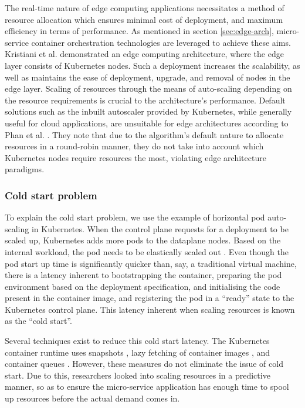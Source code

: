 The real-time nature of edge computing applications necessitates a method of resource allocation which ensures minimal cost of deployment, and maximum efficiency in terms of performance. As mentioned in section \ref{sec:edge-arch}, micro-service container orchestration technologies are leveraged to achieve these aims. Kristiani et al. \cite{kristiani2019} demonstrated an edge computing architecture, where the edge layer consists of Kubernetes nodes. Such a deployment increases the scalability, as well as maintains the ease of deployment, upgrade, and removal of nodes in the edge layer. Scaling of resources through the means of auto-scaling depending on the resource requirements is crucial to the architecture's performance. Default solutions such as the inbuilt autoscaler provided by Kubernetes, while generally useful for cloud applications, are unsuitable for edge architectures according to Phan et al. \cite{phan2022traffic}. They note that due to the algorithm's default nature to allocate resources in a round-robin manner, they do not take into account which Kubernetes nodes require resources the most, violating edge architecture paradigms.

\subsubsection{Cold start problem}
\label{subsubsec:cold-start}

To explain the cold start problem, we use the example of horizontal pod auto-scaling in Kubernetes. When the control plane requests for a deployment to be scaled up, Kubernetes adds more pods to the dataplane nodes.  Based on the internal workload, the pod needs to be elastically scaled out \cite{beni2021reducing}. Even though the pod start up time is significantly quicker than, say, a traditional virtual machine, there is a latency inherent to bootstrapping the container, preparing the pod environment based on the deployment specification, and initialising the code present in the container image, and registering the pod in a ``ready'' state to the Kubernetes control plane. This latency inherent when scaling resources is known as the ``cold start''.\par

Several techniques exist to reduce this cold start latency. The Kubernetes container runtime uses snapshots \cite{cadden2019seuss}, lazy fetching of container images \cite{lorenzo2019fogdocker}, and container queues \cite{lin2019mitigating}. However, these measures do not eliminate the issue of cold start. Due to this, researchers looked into scaling resources in a predictive manner, so as to ensure the micro-service application has enough time to spool up resources before the actual demand comes in.\par

